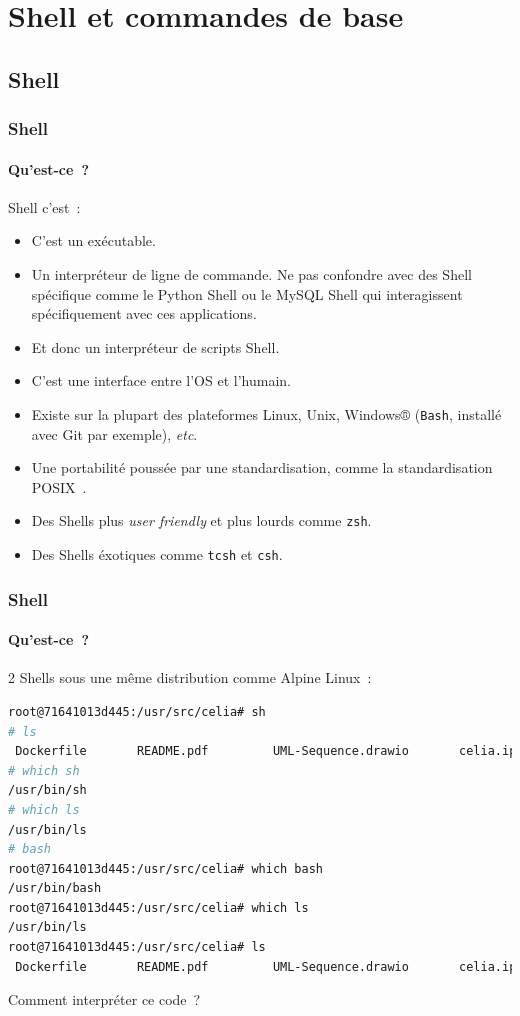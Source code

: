 \documentclass{beamer}
\begin{document}
    \section{Shell et commandes de base}\label{sec:shell-and-command}

    \subsection{Shell}\label{subsec:shell}

    \begin{frame}
        \transdissolve
        \frametitle{Shell}
        \framesubtitle{Qu'est-ce~?}
        Shell c'est~:
        \begin{itemize}
            \item C'est un exécutable.
            \item Un interpréteur de ligne de commande.
            Ne pas confondre avec des Shell spécifique comme le Python Shell ou le MySQL Shell qui interagissent spécifiquement avec ces applications.
            \item Et donc un interpréteur de scripts Shell.
            \item C'est une interface entre l'OS et l'humain.
            \item Existe sur la plupart des plateformes Linux, Unix, Windows® (\lstinline{Bash}, installé avec Git par exemple), \textit{etc}.
            \item Une portabilité poussée par une standardisation, comme la standardisation POSIX~.
            \item Des Shells plus \textit{user friendly} et plus lourds comme \lstinline{zsh}.
            \item Des Shells éxotiques comme \lstinline{tcsh} et \lstinline{csh}.
        \end{itemize}
    \end{frame}

    \begin{frame}[fragile]
        \transdissolve
        \frametitle{Shell}
        \framesubtitle{Qu'est-ce~?}
        2 Shells sous une même distribution  comme Alpine Linux~:
        \begin{lstlisting}[language=bash]
root@71641013d445:/usr/src/celia# sh
# ls
 Dockerfile       README.pdf         UML-Sequence.drawio       celia.ipynb
# which sh
/usr/bin/sh
# which ls
/usr/bin/ls
# bash
root@71641013d445:/usr/src/celia# which bash
/usr/bin/bash
root@71641013d445:/usr/src/celia# which ls
/usr/bin/ls
root@71641013d445:/usr/src/celia# ls
 Dockerfile       README.pdf         UML-Sequence.drawio       celia.ipynb
        \end{lstlisting}
        \bigbreak
        Comment interpréter ce code~?
    \end{frame}
\end{document}
